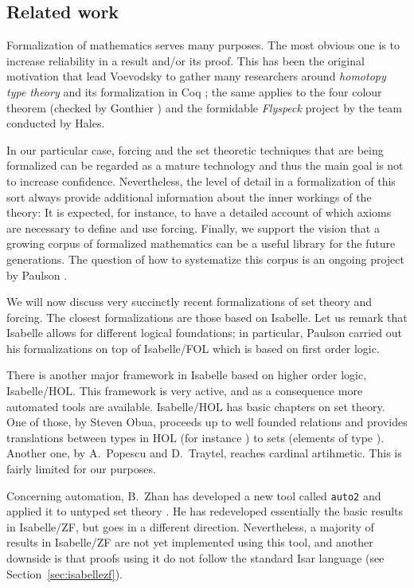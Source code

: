 \subsection{Related work}\label{sec:related-work}
Formalization of mathematics serves many purposes. The most obvious
one is to increase reliability in a result and/or its proof. This has
been the original motivation that lead Voevodsky to gather many
researchers around \emph{homotopy type theory} and its formalization in Coq
\cite{hottbook}; the same applies to the four colour theorem (checked by
Gonthier \cite{MR2463991}) and the formidable \emph{Flyspeck} project
\cite{MR3659768} by the team conducted by Hales.  

In our particular case, forcing and the set theoretic techniques that
are being formalized can be regarded as a mature technology and thus
the main goal is not to increase confidence. Nevertheless, the level
of detail in a formalization of this sort always provide additional
information about the inner workings of the theory: It is expected, for
instance, to have a detailed account of which axioms are necessary to
define and use forcing. Finally, we support the vision that a growing
corpus of formalized mathematics can be a useful library for the
future generations. The question of how to systematize this corpus is
an ongoing project by Paulson \cite{ALEXANDRIA}.

We will now discuss very succinctly recent formalizations of
set theory and forcing. The closest formalizations are those based on
Isabelle. Let us remark that Isabelle allows for different logical
foundations; in particular, Paulson carried out his formalizations
on top of Isabelle/FOL which is based on first order logic.

There is another major framework in Isabelle based on higher order
logic, Isabelle/HOL. This framework is very active, and as a 
consequence more automated tools are available. Isabelle/HOL has 
basic chapters on set theory. One of those, by Steven Obua, proceeds up to
well founded relations and provides translations between types in HOL
(for instance ) to  sets  (elements of type
). Another one, by A.~Popescu and D.~Traytel, reaches
cardinal artihmetic. This is fairly limited for our purposes.

Concerning automation, B.~Zhan has developed a new tool called
\texttt{auto2} and applied it to untyped set theory
\cite{10.1007/978-3-319-66107-0_32}. He has redeveloped essentially
the basic results in Isabelle/ZF, but goes in a different
direction. Nevertheless, a majority of results in
Isabelle/ZF are not yet implemented using this tool, and  another
downside is that proofs using it do not follow the standard Isar
language (see Section~\ref{sec:isabellezf}).

